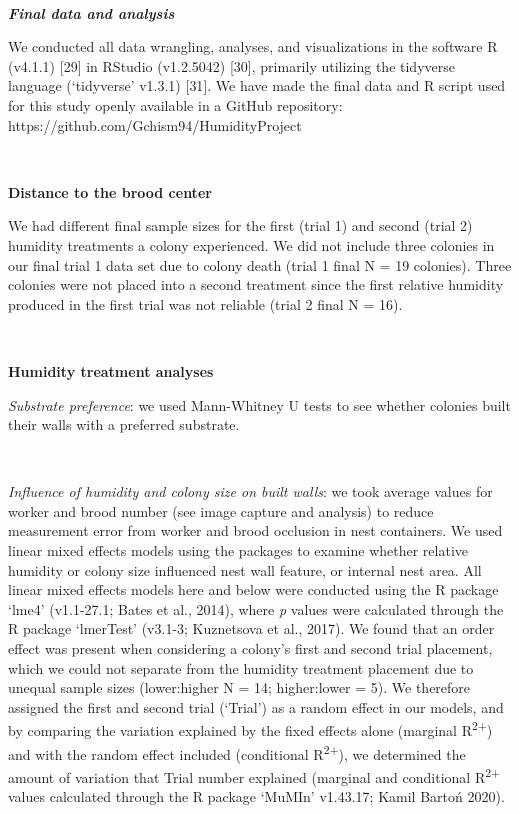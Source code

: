\documentclass[3p]{elsarticle} %
\begin{document}
~

\textbf{\emph{Final data and analysis}}

We conducted all data wrangling, analyses, and visualizations in the
software R (v4.1.1) {[}29{]} in RStudio (v1.2.5042) {[}30{]}, primarily
utilizing the tidyverse language (`tidyverse' v1.3.1) {[}31{]}. We have
made the final data and R script used for this study openly available in
a GitHub repository: https://github.com/Gchism94/HumidityProject

~

\textbf{Distance to the brood center}

We had different final sample sizes for the first (trial 1) and second
(trial 2) humidity treatments a colony experienced. We did not include
three colonies in our final trial 1 data set due to colony death (trial
1 final N = 19 colonies). Three colonies were not placed into a second
treatment since the first relative humidity produced in the first trial
was not reliable (trial 2 final N = 16).

~

\textbf{Humidity treatment analyses}

\emph{Substrate preference}: we used Mann-Whitney U tests to see whether
colonies built their walls with a preferred substrate.

~

\emph{Influence of humidity and colony size on built walls}: we took
average values for worker and brood number (see image capture and
analysis) to reduce measurement error from worker and brood occlusion in
nest containers. We used linear mixed effects models using the packages
to examine whether relative humidity or colony size influenced nest wall
feature, or internal nest area. All linear mixed effects models here and
below were conducted using the R package `lme4' (v1.1-27.1; Bates et
al., 2014), where \emph{p} values were calculated through the R package
`lmerTest' (v3.1-3; Kuznetsova et al., 2017). We found that an order
effect was present when considering a colony's first and second trial
placement, which we could not separate from the humidity treatment
placement due to unequal sample sizes (lower:higher N = 14; higher:lower
= 5). We therefore assigned the first and second trial (`Trial') as a
random effect in our models, and by comparing the variation explained by
the fixed effects alone (marginal R\textsuperscript{2+}) and with the
random effect included (conditional R\textsuperscript{2+}), we
determined the amount of variation that Trial number explained (marginal
and conditional R\textsuperscript{2+} values calculated through the R
package `MuMIn' v1.43.17; Kamil Bartoń 2020).
\end{document}
